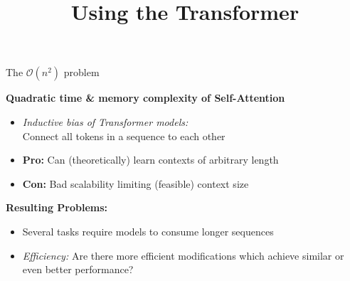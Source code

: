



\newcommand{\titlefigure}{figure/sesamestreet.jpeg}
\newcommand{\learninggoals}{
\item Understand the efficiency problems and shortcomings of transformer-based models
\item Learn about some strategies to alleviate them}

\title{Using the Transformer}
\date{}





\begin{frame}{The $\mathcal{O}(n^2)$ problem}

\vfill

\textbf{Quadratic time \& memory complexity of Self-Attention}

\begin{itemize}
	\item \textit{Inductive bias of Transformer models:}\\
				Connect all tokens in a sequence to each other
	\item \textbf{Pro:} Can (theoretically) learn contexts of arbitrary length
	\item \textbf{Con:} Bad scalability limiting (feasible) context size
\end{itemize}

\vspace{.3cm}

\textbf{Resulting Problems:}

\begin{itemize}
	\item Several tasks require models to consume longer sequences
	\item \textit{Efficiency:} Are there more efficient modifications which achieve similar or even better performance? 
\end{itemize}
	
\vfill

\end{frame}


